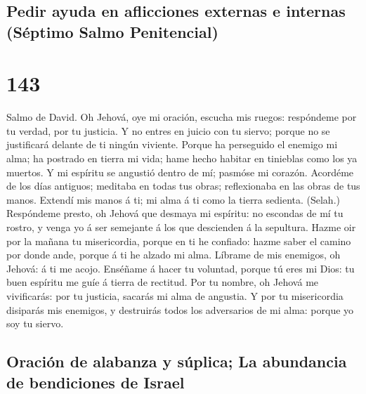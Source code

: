 \hypertarget{pedir-ayuda-en-aflicciones-externas-e-internas-suxe9ptimo-salmo-penitencial}{%
\subsection{Pedir ayuda en aflicciones externas e internas (Séptimo
Salmo
Penitencial)}\label{pedir-ayuda-en-aflicciones-externas-e-internas-suxe9ptimo-salmo-penitencial}}

\hypertarget{section-142}{%
\section{143}\label{section-142}}

 Salmo de David. Oh Jehová, oye mi oración, escucha mis
ruegos: respóndeme por tu verdad, por tu justicia.  Y no
entres en juicio con tu siervo; porque no se justificará delante de ti
ningún viviente.  Porque ha perseguido el enemigo mi alma;
ha postrado en tierra mi vida; hame hecho habitar en tinieblas como los
ya muertos.  Y mi espíritu se angustió dentro de mí;
pasmóse mi corazón.  Acordéme de los días antiguos;
meditaba en todas tus obras; reflexionaba en las obras de tus manos.
 Extendí mis manos á ti; mi alma á ti como la tierra
sedienta. (Selah.)  Respóndeme presto, oh Jehová que
desmaya mi espíritu: no escondas de mí tu rostro, y venga yo á ser
semejante á los que descienden á la sepultura.  Hazme oir
por la mañana tu misericordia, porque en ti he confiado: hazme saber el
camino por donde ande, porque á ti he alzado mi alma. 
Líbrame de mis enemigos, oh Jehová: á ti me acojo. 
Enséñame á hacer tu voluntad, porque tú eres mi Dios: tu buen espíritu
me guíe á tierra de rectitud.  Por tu nombre, oh Jehová
me vivificarás: por tu justicia, sacarás mi alma de angustia.
 Y por tu misericordia disiparás mis enemigos, y
destruirás todos los adversarios de mi alma: porque yo soy tu siervo.

\hypertarget{oraciuxf3n-de-alabanza-y-suxfaplica-la-abundancia-de-bendiciones-de-israel}{%
\subsection{Oración de alabanza y súplica; La abundancia de bendiciones
de
Israel}\label{oraciuxf3n-de-alabanza-y-suxfaplica-la-abundancia-de-bendiciones-de-israel}}

